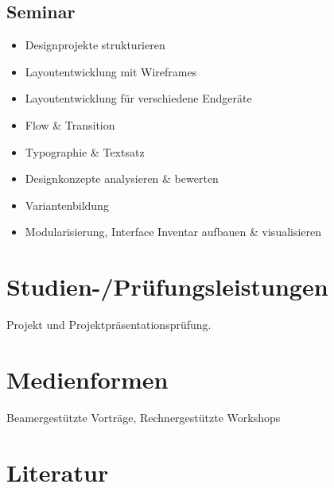 \subsection*{Seminar\label{/mi-2017/modulbeschreibungen-bachelor/BA_Screendesign}}\label{seminarpathlabelmi-2017modulbeschreibungen-bachelorbaux5fscreendesign}

\begin{itemize}
\tightlist
\item
  Designprojekte strukturieren
\item
  Layoutentwicklung mit Wireframes
\item
  Layoutentwicklung für verschiedene Endgeräte
\item
  Flow \& Transition
\item
  Typographie \& Textsatz
\item
  Designkonzepte analysieren \& bewerten
\item
  Variantenbildung
\item
  Modularisierung, Interface Inventar aufbauen \& visualisieren
\end{itemize}

\section*{Studien-/Prüfungsleistungen\label{/mi-2017/modulbeschreibungen-bachelor/BA_Screendesign}}\label{studien-pruxfcfungsleistungenpathlabelmi-2017modulbeschreibungen-bachelorbaux5fscreendesign}

Projekt und Projektpräsentationsprüfung.

\section*{Medienformen\label{/mi-2017/modulbeschreibungen-bachelor/BA_Screendesign}}\label{medienformenpathlabelmi-2017modulbeschreibungen-bachelorbaux5fscreendesign}

Beamergestützte Vorträge, Rechnergestützte Workshops

\section*{Literatur\label{/mi-2017/modulbeschreibungen-bachelor/BA_Screendesign}}\label{literaturpathlabelmi-2017modulbeschreibungen-bachelorbaux5fscreendesign}

